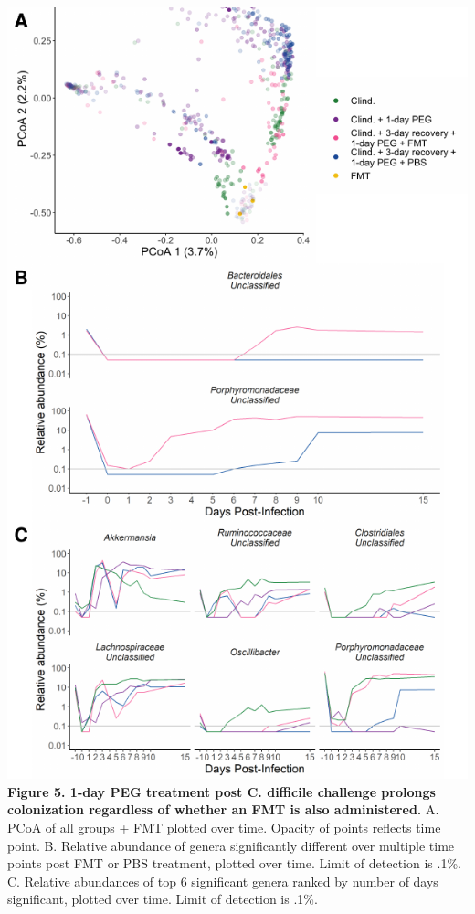 \documentclass[
  11pt,
]{article}
\begin{document}
\newpage

\includegraphics{figure_5_16S.pdf} \textbf{Figure 5. 1-day PEG treatment
post C. difficile challenge prolongs colonization regardless of whether
an FMT is also administered.} A. PCoA of all groups + FMT plotted over
time. Opacity of points reflects time point. B. Relative abundance of
genera significantly different over multiple time points post FMT or PBS
treatment, plotted over time. Limit of detection is .1\%. C. Relative
abundances of top 6 significant genera ranked by number of days
significant, plotted over time. Limit of detection is .1\%.
\end{document}
